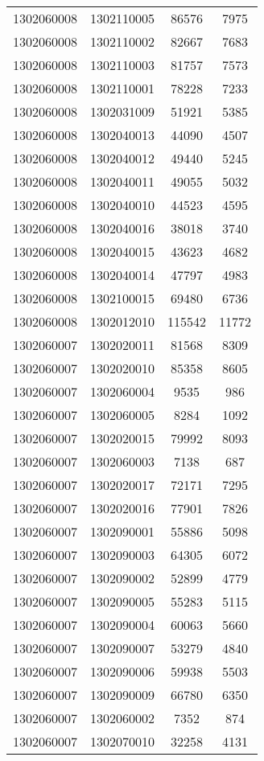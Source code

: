 \begin{longtable}[h]{llcc}
		1302060008 & 1302110005 & 86576 & 7975\\
		1302060008 & 1302110002 & 82667 & 7683\\
		1302060008 & 1302110003 & 81757 & 7573\\
		1302060008 & 1302110001 & 78228 & 7233\\
		1302060008 & 1302031009 & 51921 & 5385\\
		1302060008 & 1302040013 & 44090 & 4507\\
		1302060008 & 1302040012 & 49440 & 5245\\
		1302060008 & 1302040011 & 49055 & 5032\\
		1302060008 & 1302040010 & 44523 & 4595\\
		1302060008 & 1302040016 & 38018 & 3740\\
		1302060008 & 1302040015 & 43623 & 4682\\
		1302060008 & 1302040014 & 47797 & 4983\\
		1302060008 & 1302100015 & 69480 & 6736\\
		1302060008 & 1302012010 & 115542 & 11772\\
		1302060007 & 1302020011 & 81568 & 8309\\
		1302060007 & 1302020010 & 85358 & 8605\\
		1302060007 & 1302060004 & 9535 & 986\\
		1302060007 & 1302060005 & 8284 & 1092\\
		1302060007 & 1302020015 & 79992 & 8093\\
		1302060007 & 1302060003 & 7138 & 687\\
		1302060007 & 1302020017 & 72171 & 7295\\
		1302060007 & 1302020016 & 77901 & 7826\\
		1302060007 & 1302090001 & 55886 & 5098\\
		1302060007 & 1302090003 & 64305 & 6072\\
		1302060007 & 1302090002 & 52899 & 4779\\
		1302060007 & 1302090005 & 55283 & 5115\\
		1302060007 & 1302090004 & 60063 & 5660\\
		1302060007 & 1302090007 & 53279 & 4840\\
		1302060007 & 1302090006 & 59938 & 5503\\
		1302060007 & 1302090009 & 66780 & 6350\\
		1302060007 & 1302060002 & 7352 & 874\\
		1302060007 & 1302070010 & 32258 & 4131\\

\end{longtable}
